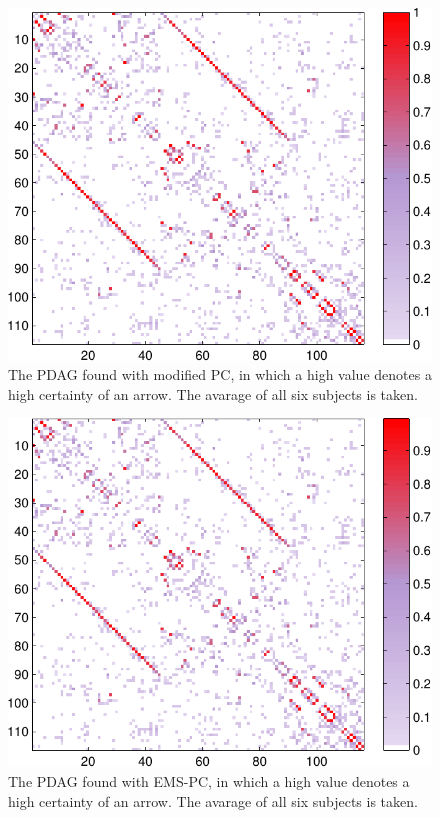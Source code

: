 \documentclass[a4paper, 10pt, english, onecolumn]{article}
\begin{document}
\begin{figure}[h!]
  \centering
  \includegraphics{images/pdag_avg_colored_mod}
  \caption{The PDAG found with modified PC, in which a high value denotes a high certainty of an arrow. The avarage of all six subjects is taken.}
  \label{fig:pdag_avg_mod}
\end{figure}

\begin{figure}[h!]
  \centering
  \includegraphics{images/PDAG_avg_colored_expl}
  \caption{The PDAG found with EMS-PC, in which a high value denotes a high certainty of an arrow. The avarage of all six subjects is taken.}
  \label{fig:pdag_avg_ems}
\end{figure}
\end{document}
